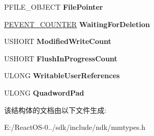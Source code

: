\begin{DoxyCompactItemize}
\begin{tabbing}
\end{tabbing}\item 
\mbox{\label{struct___c_o_n_t_r_o_l___a_r_e_a_a92138cd2cdc0eecfe555d31e07e14ac0}} 
P\+F\+I\+L\+E\+\_\+\+O\+B\+J\+E\+CT {\bfseries File\+Pointer}
\item 
\mbox{\label{struct___c_o_n_t_r_o_l___a_r_e_a_a1dd221249cd669a59c64d52d830aa8e4}} 
\hyperlink{struct___e_v_e_n_t___c_o_u_n_t_e_r}{P\+E\+V\+E\+N\+T\+\_\+\+C\+O\+U\+N\+T\+ER} {\bfseries Waiting\+For\+Deletion}
\item 
\mbox{\label{struct___c_o_n_t_r_o_l___a_r_e_a_ab3888c3dbe08a7ac139269b37ecf49e4}} 
U\+S\+H\+O\+RT {\bfseries Modified\+Write\+Count}
\item 
\mbox{\label{struct___c_o_n_t_r_o_l___a_r_e_a_ab85014c3f978d37245cf0a0b3bf08fb7}} 
U\+S\+H\+O\+RT {\bfseries Flush\+In\+Progress\+Count}
\item 
\mbox{\label{struct___c_o_n_t_r_o_l___a_r_e_a_a67cae426a2a49e5eba3121dbea24b44b}} 
U\+L\+O\+NG {\bfseries Writable\+User\+References}
\item 
\mbox{\label{struct___c_o_n_t_r_o_l___a_r_e_a_a5e937146ad31b6dba6d659cf6d421ef5}} 
U\+L\+O\+NG {\bfseries Quadword\+Pad}
\end{DoxyCompactItemize}


该结构体的文档由以下文件生成\+:\begin{DoxyCompactItemize}
\item 
E\+:/\+React\+O\+S-\/0../sdk/include/ndk/mmtypes.\+h\end{DoxyCompactItemize}
